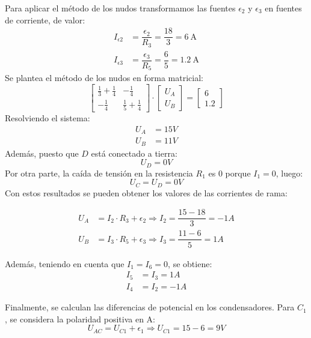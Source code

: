Para aplicar el método de los nudos transformamos las fuentes
$\epsilon_2$ y $\epsilon_3$ en fuentes de corriente, de valor:
\begin{align*}
  I_{\epsilon2}&=\dfrac{\epsilon_2}{R_3}=\dfrac{18}{3}=\qty{6}{\ampere}\\
  I_{\epsilon3}&=\dfrac{\epsilon_3}{R_5}=\dfrac{6}{5}=\qty{1.2}{\ampere}
\end{align*}
Se plantea el método de los nudos en forma matricial:
\begin{equation*}
  \begin{bmatrix}
    \frac{1}{3} + \frac{1}{4} & -\frac{1}{4}\\
    -\frac{1}{4} & \frac{1}{5} + \frac{1}{4}
  \end{bmatrix} \cdot %
  \begin{bmatrix}
    U_A\\
    U_B
  \end{bmatrix} = %
  \begin{bmatrix}
    6\\
    1.2
  \end{bmatrix}
\end{equation*}
Resolviendo el sistema:
\begin{align*}
  U_A &= {15}V\\
  U_B &= {11} V
\end{align*}
Además, puesto que $D$ está conectado a tierra:
\begin{equation*}
  {U_D = 0 V}
\end{equation*}
Por otra parte, la caída de tensión en la resistencia $R_1$ es 0
porque $I_1 = 0$, luego:
\begin{equation*}
  {U_C = U_D=0 V}
\end{equation*}
Con estos resultados se pueden obtener los valores de las corrientes
de rama:

\begin{align*}
  U_A&= I_2 \cdot R_3 + \epsilon_2\Rightarrow I_2=\dfrac{15-18}{3}={-1 A}\\
  U_B& = I_3 \cdot R_5 + \epsilon_3\Rightarrow I_3=\dfrac{11-6}{5}={1 A}
\end{align*}

Además, teniendo en cuenta que $I_1 = I_6 = 0$, se obtiene:
\begin{align*}
  I_5 &= I_3=1A\\
  I_4 &= I_2=-1 A
\end{align*}

Finalmente, se calculan las diferencias de potencial en los
condensadores. Para $C_1$, se considera la polaridad positiva en A:
\begin{equation*}
  U_{AC} = U_{C1} + \epsilon_1 \Rightarrow U_{C1} = 15-6= {{9} V}
\end{equation*}

